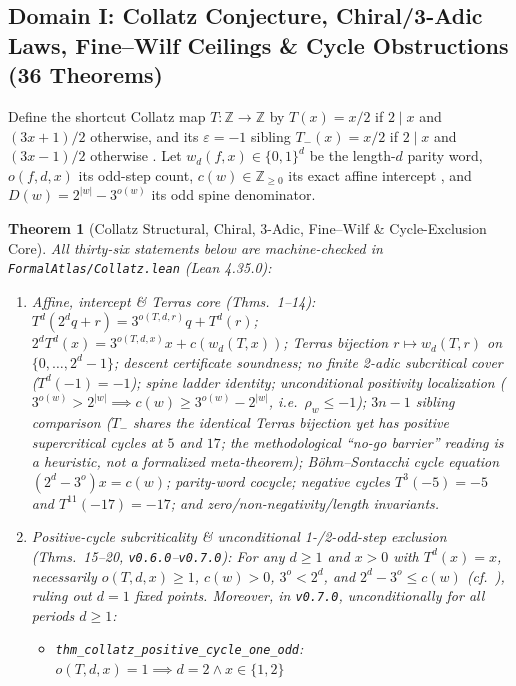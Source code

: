 \documentclass[11pt,reqno]{amsart}
\theoremstyle{plain}
\newtheorem{theorem}{Theorem}[section]
\theoremstyle{definition}
\newcommand{\Z}{\mathbb{Z}}
\newcommand{\code}[1]{{\upshape\nolinkurl{#1}}}
\begin{document}
\subsection{Domain I: Collatz Conjecture, Chiral/3-Adic Laws, Fine--Wilf Ceilings \& Cycle Obstructions (36 Theorems)}
Define the shortcut Collatz map $T : \Z \to \Z$ by $T(x) = x/2$ if $2 \mid x$ and $(3x+1)/2$
otherwise, and its $\varepsilon=-1$ sibling $T_-(x) = x/2$ if $2 \mid x$ and $(3x-1)/2$
otherwise \cite{terras1976,lagarias1985}. Let $w_d(f, x) \in \{0,1\}^d$ be the length-$d$ parity
word, $o(f,d,x)$ its odd-step count, $c(w) \in \Z_{\ge 0}$ its exact affine intercept
\cite{bernsteinlagarias1996}, and $D(w) = 2^{|w|} - 3^{o(w)}$ its odd spine denominator.

\begin{theorem}[Collatz Structural, Chiral, 3-Adic, Fine--Wilf \& Cycle-Exclusion Core]\label{thm:collatz}
All thirty-six statements below are machine-checked in \code{FormalAtlas/Collatz.lean} (Lean 4.35.0):
\begin{enumerate}
  \item \emph{Affine, intercept \& Terras core (Thms.~1--14):}
    $T^d(2^d q + r) = 3^{o(T,d,r)} q + T^d(r)$;
    $2^d T^d(x) = 3^{o(T,d,x)} x + c(w_d(T,x))$;
    Terras bijection \cite{terras1976} $r \mapsto w_d(T, r)$ on $\{0,\dots,2^d-1\}$;
    descent certificate soundness; no finite 2-adic subcritical cover ($T^d(-1)=-1$);
    spine ladder identity; \emph{unconditional positivity localization} ($3^{o(w)} > 2^{|w|} \implies c(w) \ge 3^{o(w)} - 2^{|w|}$, i.e.\ $\rho_w \le -1$);
    \emph{$3n-1$ sibling comparison} ($T_-$ shares the identical Terras bijection yet has positive supercritical cycles at $5$ and $17$; the methodological ``no-go barrier'' reading is a heuristic, not a formalized meta-theorem);
    B\"ohm--Sontacchi cycle equation \cite{bohm1978} $(2^d - 3^o)x = c(w)$;
    parity-word cocycle; negative cycles $T^3(-5)=-5$ and $T^{11}(-17)=-17$; and zero/non-negativity/length invariants.
  \item \emph{Positive-cycle subcriticality \& unconditional 1-/2-odd-step exclusion (Thms.~15--20, \texttt{v0.6.0}--\texttt{v0.7.0}):}
    For any $d \ge 1$ and $x > 0$ with $T^d(x) = x$, necessarily $o(T,d,x) \ge 1$, $c(w) > 0$,
    $3^o < 2^d$, and $2^d - 3^o \le c(w)$ (cf.\ \cite{eliahou1993,simonsdeweger2005,hercher2023}),
    ruling out $d=1$ fixed points. Moreover, in \texttt{v0.7.0}, \emph{unconditionally for all periods $d \ge 1$}:
    \begin{itemize}
      \item \code{thm_collatz_positive_cycle_one_odd}: $o(T,d,x) = 1 \implies d = 2 \land x \in \{1, 2\}$

\end{itemize}
\end{enumerate}
\end{theorem}
\end{document}

